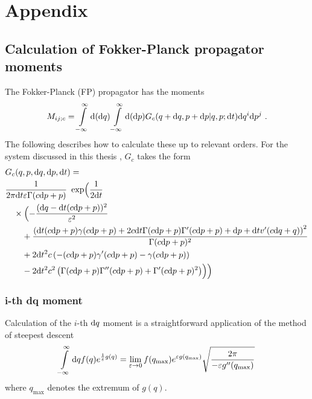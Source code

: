 \chapter{Appendix}

\section{Calculation of Fokker-Planck propagator moments}
\label{sec:fp moments}

The Fokker-Planck (FP) propagator has the moments
\begin{align}
	\label{eqn:fp-moment-integral}
	M_{ij;c} =
		\int\limits_{-\infty}^\infty\mathrm{d} (\mathrm{d} q)
		\int\limits_{-\infty}^\infty\mathrm{d} (\mathrm{d} p)
		G_c(q+\mathrm{d} q,p+\mathrm{d} p|q,p; \mathrm{d} t)\mathrm{d} q^i\mathrm{d} p^j ~.
\end{align}
%
The following describes how to calculate these up to relevant orders. For the system discussed in this thesis  \cite{flow-paper}, \(G_c\) takes the form
%
\begin{align}
	\label{eqn:fp-propagator}
	&G_c(q,p,\mathrm{d} q,\mathrm{d} p,\mathrm{d} t) = \\ \notag
	& \frac1{2 \pi  \mathrm{d} t \varepsilon  \Gamma (c \mathrm{d} p +p)}
	  ~\operatorname{exp} \Bigl(\frac1{2 \mathrm{d} t} \\ \notag
	&\quad \times \Bigl(
		-\frac{(\mathrm{d} q-\mathrm{d} t (c \mathrm{d} p +p))^2}{\varepsilon ^2} \\ \notag
		&\qquad +\frac{\left(\mathrm{d} t (c \mathrm{d} p +p) \gamma (c \mathrm{d} p +p)+2 c \mathrm{d} t  \Gamma (c \mathrm{d} p +p) \Gamma '(c \mathrm{d} p +p)+\mathrm{d} p+\mathrm{d} t v'(c \mathrm{d} q+q)\right)^2}{\Gamma (c \mathrm{d} p +p)^2} \\ \notag
		&\qquad +2 \mathrm{d} t^2 c  \left(-(c \mathrm{d} p +p) \gamma '(c \mathrm{d} p +p)-\gamma (c \mathrm{d} p +p)\right) \\ \notag
		&\qquad -2 \mathrm{d} t^2 c ^2 \left(\Gamma (c \mathrm{d} p +p) \Gamma ''(c \mathrm{d} p +p)+\Gamma '(c \mathrm{d} p +p)^2\right)\Bigr)\Bigr)
\end{align}


\subsection{i-th dq moment}

Calculation of the \(i\)-th \(\mathrm{d} q\) moment is a straightforward application of the method of steepest descent 
\begin{align}
	\int\limits_{-\infty}^\infty\mathrm{d} q f(q)e^{\frac1\varepsilon g(q)}
	= \lim_{\varepsilon\to0} f(q_{\text{max}}) e^{\varepsilon g(q_{\text{max}})}\sqrt{\frac{2\pi}{-\varepsilon g''(q_{\text{max}})}}
\end{align}
where \(q_{\text{max}}\) denotes the extremum of \(g(q)\).


